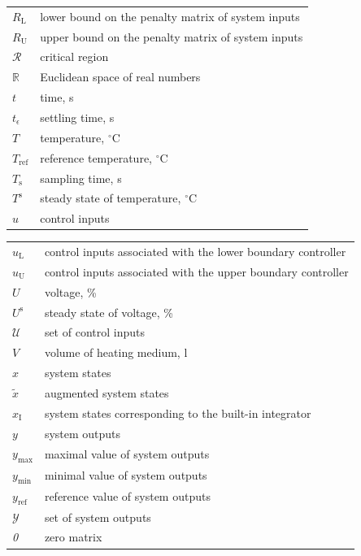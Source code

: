 \documentclass[preprint,12pt]{elsarticle}
\begin{document}
\begin{tabular}{ l l }
			$R_{\mathrm{L}}$ & lower bound on the penalty matrix of system inputs \\
			$R_{\mathrm{U}}$ & upper bound on the penalty matrix of system inputs \\
			$\mathcal{R}$ & critical region \\
			$\mathbb{R}$ & Euclidean space of real numbers \\
			$t$ & time, s \\
			$t_{\epsilon}$ & settling time, s \\
			$T$ & temperature, $^{\circ}\mathrm{C}$ \\
			$T_{\mathrm{ref}}$ & reference temperature, $^{\circ}\mathrm{C}$ \\
			$T_{\mathrm{s}}$ & sampling time, s \\
			$T^{\mathrm{s}}$ & steady state of temperature, $^{\circ}\mathrm{C}$ \\
			$u$ & control inputs \\
		\end{tabular}
	
	
		\begin{tabular}{ l l }
			$u_{\mathrm{L}}$ & control inputs associated with the lower boundary controller\\
			$u_{\mathrm{U}}$ & control inputs associated with the upper boundary controller\\
			$U$ & voltage, \% \\
			$U^{\mathrm{s}}$ & steady state of voltage, \% \\
			$\mathcal{U}$ & set of control inputs \\
			$V$ & volume of heating medium, l \\
			$x$ & system states \\
			$\widetilde{x}$ & augmented system states \\
			$x_{\mathrm{I}}$ & system states corresponding to the built-in integrator \\
			$y$ & system outputs \\
			$y_\mathrm{\max}$ & maximal value of system outputs \\
			$y_\mathrm{\min}$ & minimal value of system outputs \\
			$y_\mathrm{ref}$ & reference value of system outputs \\
			$\mathcal{Y}$ & set of system outputs \\
			\textit{0} & zero matrix
		\end{tabular}
	
\end{document}
